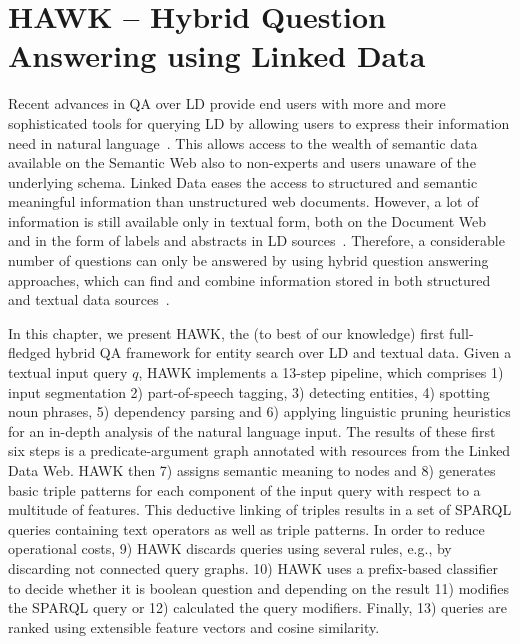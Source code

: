 \chapter{HAWK -- Hybrid Question Answering using Linked Data}



Recent advances in \ac{QA} over \ac{LD} provide end users with more and more sophisticated tools for querying \ac{LD} by allowing users to express their information need in natural language~\cite{SINA_WebSemantic,pythia,template}. 
This allows access to the wealth of semantic data available on the Semantic Web also to non-experts and users unaware of the underlying schema. 
Linked Data eases the access to structured and semantic meaningful information than unstructured web documents.
However, a lot of information is still available only in textual form, both on the Document Web and in the form of labels and abstracts in \ac{LD} sources~\cite{GER+13}.
Therefore, a considerable number of questions can only be answered by using hybrid question answering approaches, which  can find and combine information stored in both structured and textual data sources~\cite{combiningLDandIR}.

In this chapter, we present HAWK, the (to best of our knowledge) first full-fledged hybrid \ac{QA} framework for entity search over \ac{LD} and textual data. 
Given a textual input query $q$, HAWK implements a 13-step pipeline, which comprises 1) input segmentation 2) part-of-speech tagging, 3) detecting entities, 4) spotting noun phrases, 5) dependency parsing and 6) applying linguistic pruning heuristics for an in-depth analysis of the natural language input. 
The results of these first six steps is a predicate-argument graph annotated with resources from the Linked Data Web. HAWK then 7) assigns semantic meaning to nodes and 8) generates basic triple patterns for each component of the input query with respect to a multitude of features. 
This deductive linking of triples results in a set of SPARQL queries containing text operators as well as triple patterns.
In order to reduce operational costs, 9) HAWK discards queries using several rules, e.g., by  discarding not connected query graphs.
10) HAWK uses a prefix-based classifier to decide whether it is boolean question and depending on the result 11) modifies the SPARQL query or 12) calculated the query modifiers.
Finally, 13) queries are ranked using extensible feature vectors and cosine similarity.

